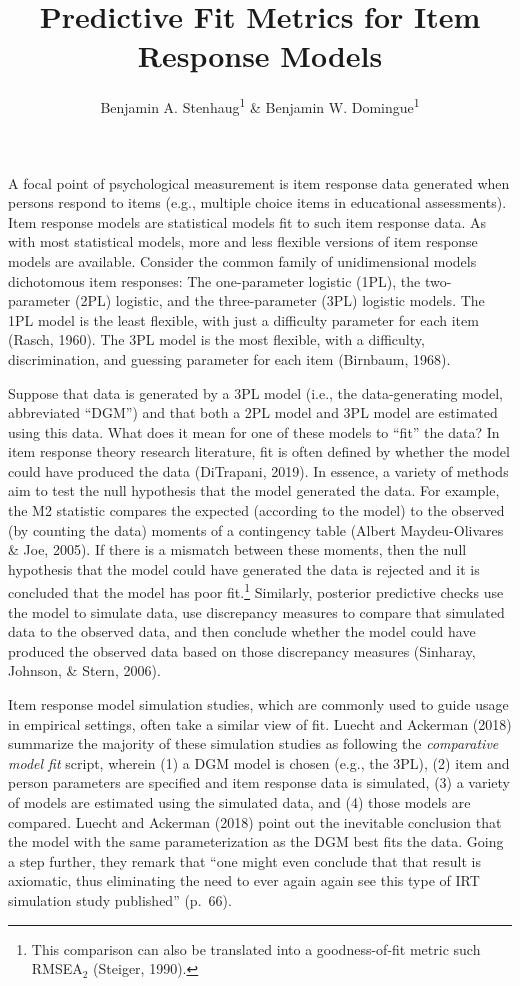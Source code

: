 \documentclass[
  english,
  man,floatsintext]{apa7}
\title{Predictive Fit Metrics for Item Response Models}
\author{Benjamin A. Stenhaug\textsuperscript{1} \& Benjamin W. Domingue\textsuperscript{1}}
\date{}
\affiliation{\vspace{0.5cm}\textsuperscript{1} The Graduate School of Education at Stanford University}
\begin{document}
\maketitle

A focal point of psychological measurement is item response data generated when persons respond to items (e.g., multiple choice items in educational assessments). Item response models are statistical models fit to such item response data. As with most statistical models, more and less flexible versions of item response models are available. Consider the common family of unidimensional models dichotomous item responses: The one-parameter logistic (1PL), the two-parameter (2PL) logistic, and the three-parameter (3PL) logistic models. The 1PL model is the least flexible, with just a difficulty parameter for each item (Rasch, 1960). The 3PL model is the most flexible, with a difficulty, discrimination, and guessing parameter for each item (Birnbaum, 1968).

Suppose that data is generated by a 3PL model (i.e., the data-generating model, abbreviated ``DGM'') and that both a 2PL model and 3PL model are estimated using this data. What does it mean for one of these models to ``fit'' the data? In item response theory research literature, fit is often defined by whether the model could have produced the data (DiTrapani, 2019). In essence, a variety of methods aim to test the null hypothesis that the model generated the data. For example, the M2 statistic compares the expected (according to the model) to the observed (by counting the data) moments of a contingency table (Albert Maydeu-Olivares \& Joe, 2005). If there is a mismatch between these moments, then the null hypothesis that the model could have generated the data is rejected and it is concluded that the model has poor fit.\footnote{This comparison can also be translated into a goodness-of-fit metric such RMSEA\(_2\) (Steiger, 1990).} Similarly, posterior predictive checks use the model to simulate data, use discrepancy measures to compare that simulated data to the observed data, and then conclude whether the model could have produced the observed data based on those discrepancy measures (Sinharay, Johnson, \& Stern, 2006).

Item response model simulation studies, which are commonly used to guide usage in empirical settings, often take a similar view of fit. Luecht and Ackerman (2018) summarize the majority of these simulation studies as following the \emph{comparative model fit} script, wherein (1) a DGM model is chosen (e.g., the 3PL), (2) item and person parameters are specified and item response data is simulated, (3) a variety of models are estimated using the simulated data, and (4) those models are compared. Luecht and Ackerman (2018) point out the inevitable conclusion that the model with the same parameterization as the DGM best fits the data. Going a step further, they remark that ``one might even conclude that that result is axiomatic, thus eliminating the need to ever again again see this type of IRT simulation study published'' (p.~66).
\end{document}
